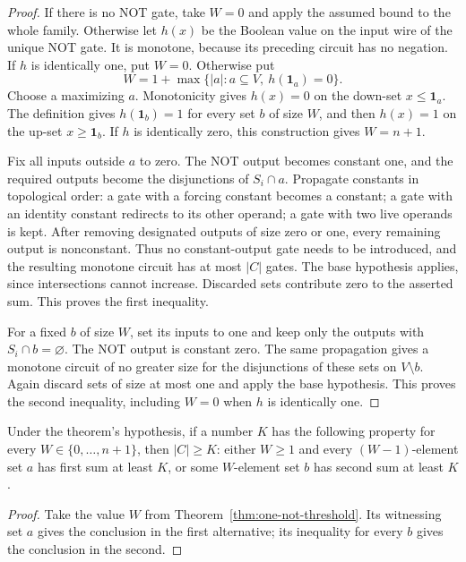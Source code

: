 \begin{proof}
If there is no NOT gate, take $W=0$ and apply the assumed bound to the whole family. Otherwise let $h(x)$ be the Boolean value on the input wire of the unique NOT gate. It is monotone, because its preceding circuit has no negation.
If $h$ is identically one, put $W=0$. Otherwise put
\[
 W=1+\max\{|a|:a\subseteq V,\ h(\mathbf1_a)=0\}.
\]
Choose a maximizing $a$. Monotonicity gives $h(x)=0$ on the down-set $x\leq\mathbf1_a$. The definition gives $h(\mathbf1_b)=1$ for every set $b$ of size $W$, and then $h(x)=1$ on the up-set $x\geq\mathbf1_b$. If $h$ is identically zero, this construction gives $W=n+1$.

Fix all inputs outside $a$ to zero. The NOT output becomes constant one, and the required outputs become the disjunctions of $S_i\cap a$. Propagate constants in topological order: a gate with a forcing constant becomes a constant; a gate with an identity constant redirects to its other operand; a gate with two live operands is kept. After removing designated outputs of size zero or one, every remaining output is nonconstant. Thus no constant-output gate needs to be introduced, and the resulting monotone circuit has at most $|C|$ gates. The base hypothesis applies, since intersections cannot increase. Discarded sets contribute zero to the asserted sum. This proves the first inequality.

For a fixed $b$ of size $W$, set its inputs to one and keep only the outputs with $S_i\cap b=\varnothing$. The NOT output is constant zero. The same propagation gives a monotone circuit of no greater size for the disjunctions of these sets on $V\setminus b$. Again discard sets of size at most one and apply the base hypothesis. This proves the second inequality, including $W=0$ when $h$ is identically one.
\end{proof}

\begin{corollary}\label{cor:threshold-bound}
Under the theorem's hypothesis, if a number $K$ has the following property for every $W\in\{0,\ldots,n+1\}$, then $|C|\geq K$: either $W\geq1$ and every $(W-1)$-element set $a$ has first sum at least $K$, or some $W$-element set $b$ has second sum at least $K$.
\end{corollary}
\begin{proof}
Take the value $W$ from Theorem~\ref{thm:one-not-threshold}. Its witnessing set $a$ gives the conclusion in the first alternative; its inequality for every $b$ gives the conclusion in the second.
\end{proof}

